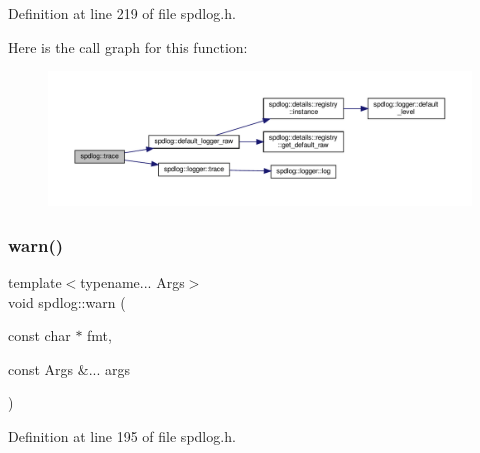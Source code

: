 Definition at line 219 of file spdlog.\+h.

Here is the call graph for this function\+:
\nopagebreak
\begin{figure}[H]
\begin{center}
\leavevmode
\includegraphics[width=350pt]{namespacespdlog_a99302a3f872e2cba98f81ac1a2f63321_cgraph}
\end{center}
\end{figure}
\mbox{\label{namespacespdlog_a41a6d93dee0e1a8c2e6153c1fc7f59df}} 
\subsubsection{\texorpdfstring{warn()}{warn()}\hspace{0.1cm}{\footnotesize\ttfamily [1/2]}}
{\footnotesize\ttfamily template$<$typename... Args$>$ \\
void spdlog\+::warn (\begin{DoxyParamCaption}\item[{const char $\ast$}]{fmt,  }\item[{const Args \&...}]{args }\end{DoxyParamCaption})\hspace{0.3cm}{\ttfamily [inline]}}



Definition at line 195 of file spdlog.\+h.

